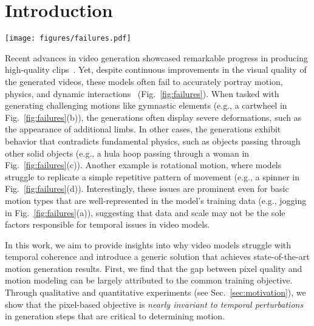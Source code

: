 \section{Introduction}
\label{sec:intro}

\begin{figure*}[t!]
\centering
\texttt{[image: figures/failures.pdf]}
\vspace{-14px}
\caption{\textbf{Motion incoherence in video generation.} Examples of incoherent generations by DiT-30B~\cite{dit}. The model struggles with (a) basic motion, e.g., jogging (stepping on the same leg repeatedly); (b) complex motion e.g., gymnastics; (c) physics, e.g., object dynamics (the hoop passes through the woman); and (d) rotational motion, failing to replicate simple repetitive patterns.}
\label{fig:failures}
\vspace{-12px}
\end{figure*}

Recent advances in video generation showcased remarkable progress in producing high-quality clips~\cite{sora,kling,moviegen}. Yet, despite continuous improvements in the visual quality of the generated videos, these models often fail to accurately portray motion, physics, and dynamic interactions~\cite{physics,sora} (Fig.~\ref{fig:failures}). When tasked with generating challenging motions like gymnastic elements (e.g., a cartwheel in Fig.~\ref{fig:failures}(b)), the generations often display severe deformations, such as the appearance of additional limbs. In other cases, the generations exhibit behavior that contradicts fundamental physics, such as objects passing through other solid objects (e.g., a hula hoop passing through a woman in Fig.~\ref{fig:failures}(c)). Another example is rotational motion, where models struggle to replicate a simple repetitive pattern of movement (e.g., a spinner in Fig.~\ref{fig:failures}(d)). Interestingly, these issues are prominent even for basic motion types that are well-represented in the model's training data (e.g., jogging in Fig.~\ref{fig:failures}(a)), suggesting that data and scale may not be the sole factors responsible for temporal issues in video models.

In this work, we aim to provide insights into why video models struggle with temporal coherence and introduce a generic solution that achieves state-of-the-art motion generation results. First, we find that the gap between pixel quality and motion modeling can be largely attributed to the common training objective. Through qualitative and quantitative experiments (see Sec.~\ref{sec:motivation}), we show that the pixel-based objective is \emph{nearly invariant to temporal perturbations} in generation steps that are critical to determining motion. 

